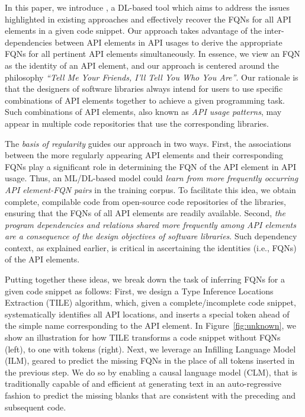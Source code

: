 In this paper, we introduce {\tool}, a DL-based tool which aims to address the issues highlighted in existing approaches and effectively recover the FQNs for all API elements in a given code snippet. Our approach takes advantage of the inter-dependencies between API elements in API usages to derive the appropriate FQNs for all pertinent API elements simultaneously. In essence, we view an FQN as the identity of an API element, and our approach is centered around the philosophy {\em ``Tell Me Your Friends, I'll Tell You Who You Are''}. 
Our rationale is that the designers of software libraries always intend for users to use specific combinations of API elements together to achieve a given programming task. Such combinations of API elements, also known as {\em API usage patterns}, may appear in multiple code repositories that use the corresponding libraries.


The {\em basis of regularity} guides our approach in two ways. First, the associations between the more regularly appearing API elements and their corresponding FQNs play a significant role in determining the FQN of the API element in API usage. Thus, an ML/DL-based model could {\em learn from more frequently occurring API element-FQN pairs} in the training corpus. To facilitate this idea, we obtain complete, compilable code from open-source code repositories of the libraries, ensuring that the FQNs of all API elements are readily available. Second, {\em the program dependencies and relations shared more frequently among API elements are a consequence of the design objectives of software libraries}. Such dependency context, as explained earlier, is critical in ascertaining the identities (i.e., FQNs) of the API elements.


Putting together these ideas, we break down the task of inferring FQNs for a given code snippet as follows: First, we design a Type Inference Locations Extraction (TILE) algorithm, which, given a complete/incomplete code snippet, systematically identifies all API locations, and inserts a special \code{[blank]} token ahead of the simple name corresponding to the API element. In Figure~\ref{fig:unknown}, we show an illustration for how TILE transforms a code snippet without FQNs (left), to one with \code{[blank]} tokens (right). Next, we leverage an Infilling Language Model~\cite{} (ILM), geared to predict the missing FQNs in the place of all \code{[blank]} tokens inserted in the previous step. We do so by enabling a causal language model (CLM), that is traditionally capable of and efficient at generating text in an auto-regressive fashion to predict the missing blanks that are consistent with the preceding and subsequent code.

